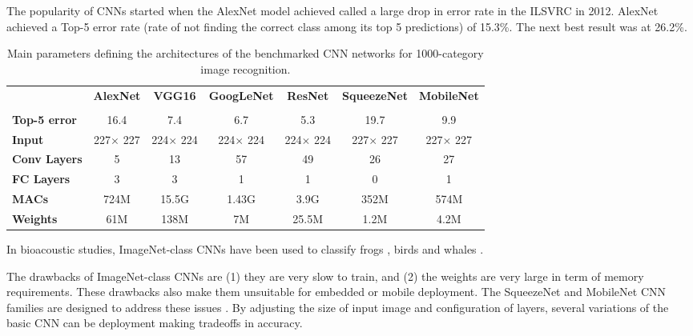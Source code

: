 The popularity of CNNs started when the AlexNet model achieved called a large drop in error rate in the ILSVRC \cite{Krizhevsky2012} in 2012. AlexNet achieved a Top-5 error rate (rate of not finding the correct class among its top 5 predictions) of 15.3\%. The next best result was at 26.2\%. 


\begin{table}%
\renewcommand{\arraystretch}{.75}
\footnotesize
\centering
\caption{Main parameters defining the architectures of the benchmarked CNN networks for 1000-category image recognition.}
\begin{tabular}{lcccccc}
\toprule
	&	\textbf{AlexNet}	&	\textbf{VGG16} & \textbf{GoogLeNet}	&	\textbf{ResNet}	&	\textbf{SqueezeNet}	&	\textbf{MobileNet}\\
	&\cite{Krizhevsky2012}&\cite{Simonyan2014}&\cite{Szegedy2016}&\cite{He2016}&\cite{Iandola2016}&\cite{Howard2017} \\
	\midrule
\textbf{Top-5 error}	& 16.4 & 7.4 & 6.7 & 5.3 & 19.7 & 9.9\\
	\midrule
\textbf{Input}	& 227$\times$ 227 & 224$\times$ 224 & 224$\times$ 224 & 224$\times$ 224 & 227$\times$ 227 & 227$\times$ 227  \\
\midrule
\textbf{Conv Layers}	&	5	&	13 & 57	&	49	&	26	&	27	\\
\midrule
\textbf{FC Layers}	&	3	&	3 &1	&	1	&	0	&	1		\\
\midrule
\textbf{MACs}	&	724M	&15.5G&	1.43G	&	3.9G & 352M & 574M\\
\midrule
\textbf{Weights}	&	61M	&	138M & 7M	&	25.5M	&	1.2M	&	4.2M  \\
\bottomrule
\end{tabular}
\end{table}

In bioacoustic studies, ImageNet-class CNNs have been used to classify frogs \cite{Xie2017}, birds \cite{Sankupellay2018} and whales \cite{Thomas2019}. 

The drawbacks of ImageNet-class CNNs are (1) they are very slow to train, and (2) the weights are very large in term of memory requirements. These drawbacks also make them unsuitable for embedded or mobile deployment. The SqueezeNet and MobileNet CNN families are designed to address these issues \cite{Iandola2016,Howard2017}. By adjusting the size of input image and configuration of layers, several variations of the basic CNN can be deployment making tradeoffs in accuracy.

